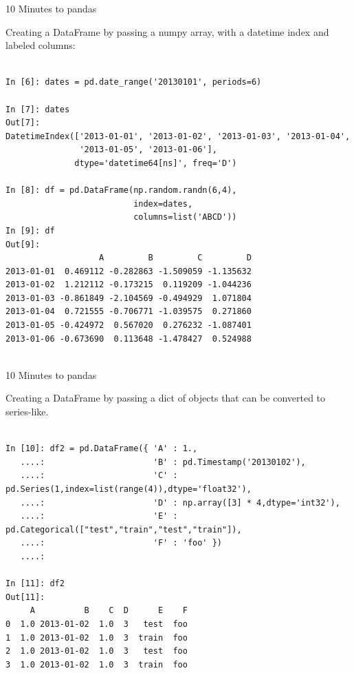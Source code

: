 \documentclass{beamer}
\begin{document}
\begin{frame}[t,fragile]{10 Minutes to pandas}

Creating a DataFrame by passing a numpy array, with a datetime index
and labeled columns:

	\scriptsize
\begin{verbatim}

In [6]: dates = pd.date_range('20130101', periods=6)

In [7]: dates
Out[7]: 
DatetimeIndex(['2013-01-01', '2013-01-02', '2013-01-03', '2013-01-04',
               '2013-01-05', '2013-01-06'],
              dtype='datetime64[ns]', freq='D')

In [8]: df = pd.DataFrame(np.random.randn(6,4), 
                          index=dates, 
                          columns=list('ABCD'))
In [9]: df
Out[9]: 
                   A         B         C         D
2013-01-01  0.469112 -0.282863 -1.509059 -1.135632
2013-01-02  1.212112 -0.173215  0.119209 -1.044236
2013-01-03 -0.861849 -2.104569 -0.494929  1.071804
2013-01-04  0.721555 -0.706771 -1.039575  0.271860
2013-01-05 -0.424972  0.567020  0.276232 -1.087401
2013-01-06 -0.673690  0.113648 -1.478427  0.524988


\end{verbatim}


\end{frame}


\begin{frame}[t,fragile]{10 Minutes to pandas}

Creating a DataFrame by passing a dict of objects that can be converted to series-like.

	\scriptsize
\begin{verbatim}

In [10]: df2 = pd.DataFrame({ 'A' : 1.,
   ....:                      'B' : pd.Timestamp('20130102'),
   ....:                      'C' : pd.Series(1,index=list(range(4)),dtype='float32'),
   ....:                      'D' : np.array([3] * 4,dtype='int32'),
   ....:                      'E' : pd.Categorical(["test","train","test","train"]),
   ....:                      'F' : 'foo' })
   ....: 

In [11]: df2
Out[11]: 
     A          B    C  D      E    F
0  1.0 2013-01-02  1.0  3   test  foo
1  1.0 2013-01-02  1.0  3  train  foo
2  1.0 2013-01-02  1.0  3   test  foo
3  1.0 2013-01-02  1.0  3  train  foo


\end{verbatim}


\end{frame}
\end{document}
